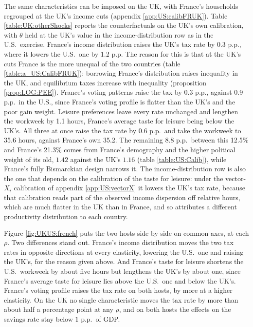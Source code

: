 The same characteristics can be imposed on the UK, with France's households regrouped at the UK's income cuts (appendix \ref{app:US:calibFRUK}). Table \ref{table:UK:otherShocks} reports the counterfactuals on the UK's own calibration, with $\theta$ held at the UK's value in the income-distribution row as in the U.S.\ exercise. France's income distribution raises the UK's tax rate by 0.3 p.p., where it lowers the U.S.\ one by 1.2 p.p. The reason for this is that at the UK's cuts France is the more unequal of the two countries (table \ref{table:a_US:CalibFRUK}): borrowing France's distribution raises inequality in the UK, and equilibrium taxes increase with inequality (proposition \ref{prop:LOG:PEE}). France's voting patterns raise the tax by 0.3 p.p., against 0.9 p.p.\ in the U.S., since France's voting profile is flatter than the UK's and the poor gain weight. Leisure preferences leave every rate unchanged and lengthen the workweek by 1.1 hours, France's average taste for leisure being below the UK's. All three at once raise the tax rate by 0.6 p.p.\ and take the workweek to 35.6 hours, against France's own 35.2. The remaining 8.8 p.p.\ between this 12.5\% and France's 21.3\% comes from France's demography and the higher political weight of its old, $1.42$ against the UK's $1.16$ (table \ref{table:US:Calib}), while France's fully Bismarckian design narrows it. The income-distribution row is also the one that depends on the calibration of the taste for leisure: under the vector-$X_i$ calibration of appendix \ref{app:US:vectorX} it lowers the UK's tax rate, because that calibration reads part of the observed income dispersion off relative hours, which are much flatter in the UK than in France, and so attributes a different productivity distribution to each country.



Figure \ref{fig:UKUS:french} puts the two hosts side by side on common axes, at each $\rho$. Two differences stand out. France's income distribution moves the two tax rates in opposite directions at every elasticity, lowering the U.S.\ one and raising the UK's, for the reason given above. And France's taste for leisure shortens the U.S.\ workweek by about five hours but lengthens the UK's by about one, since France's average taste for leisure lies above the U.S.\ one and below the UK's. France's voting profile raises the tax rate on both hosts, by more at a higher elasticity. On the UK no single characteristic moves the tax rate by more than about half a percentage point at any $\rho$, and on both hosts the effects on the savings rate stay below $1$ p.p.\ of GDP.

